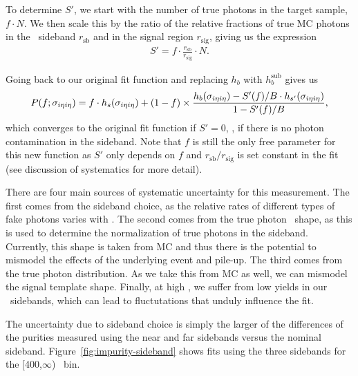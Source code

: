 To determine $S'$, we start with the number of true photons in the target sample, $f \cdot N$. 
We then scale this by the ratio of the relative fractions of true MC photons in the \ICH\ sideband $r_{\text{sb}}$ and in the signal region $r_{\text{sig}}$, giving us the expression
\begin{align}
  S' = f \cdot \frac{r_{\text{sb}}}{r_{\text{sig}}} \cdot N .
\end{align}

Going back to our original fit function and replacing $h_{b}$ with $h_{b}^{\text{sub}}$ gives us
\begin{align}
  P(f;\sigma_{i\eta i\eta}) = f \cdot h_{s}(\sigma_{i\eta i\eta}) + (1 - f) \times \frac{h_{b}(\sigma_{i\eta i\eta}) - S'(f)/B \cdot h_{s'}(\sigma_{i\eta i\eta})}{1 - S'(f)/B},
\end{align}
which converges to the original fit function if $S' = 0$, \ie, if there is no photon contamination in the sideband. 
Note that $f$ is still the only free parameter for this new function as $S'$ only depends on $f$ and $r_{\text{sb}} / r_{\text{sig}}$ is set constant in the fit (see discussion of systematics for more detail).

There are four main sources of systematic uncertainty for this measurement. 
The first comes from the sideband choice, as the relative rates of different types of fake photons varies with \ICH. 
The second comes from the true photon \ICH\ shape, as this is used to determine the normalization of true photons in the sideband. 
Currently, this shape is taken from MC and thus there is the potential to mismodel the effects of the underlying event and pile-up. 
The third comes from the true photon \sieie distribution. 
As we take this from MC as well, we can mismodel the signal template shape. 
Finally, at high \pt, we suffer from low yields in our \ICH\ sidebands, which can lead to
fluctutations that unduly influence the fit.

The uncertainty due to sideband choice is simply the larger of the differences of the purities measured using the near and far sidebands versus the nominal sideband. 
Figure~\ref{fig:impurity-sideband} shows fits using the three sidebands for the [400,$\infty$) \pt\ bin.


